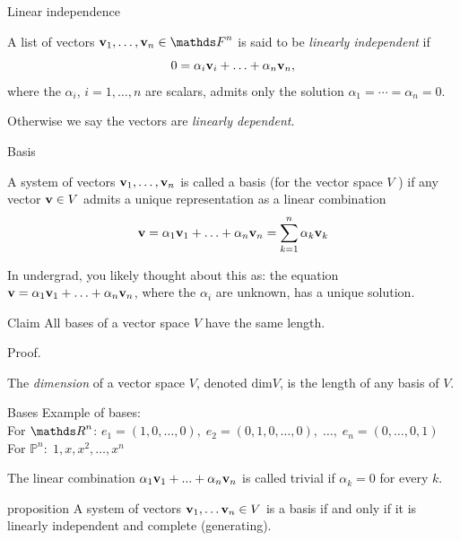\documentclass [aspectratio=169]{beamer}
\begin{document}
\begin{frame}{Linear independence}
\begin{definition}
A list of vectors $\bv_1, \ldots, \bv_n \in \F^n$ is said to be \emph{linearly independent} if 
$$ 0 = \alpha_i {\mathbf{v}}_i + \ldots + \alpha_n {\mathbf{v}}_n, $$
where the $\alpha_i$, $i=1,\ldots,n$ are scalars, admits only the solution $\alpha_1 = \cdots = \alpha_n = 0$.
\end{definition}

\vspace{1em} Otherwise we say the vectors are \emph{linearly dependent}.

\end{frame}


\begin{frame}{Basis}
\begin{definition}
A system of vectors ${\mathbf{v}}_1, \ldots, {\mathbf{v}}_n$ is called a basis (for the vector space $V$ ) if any vector ${\mathbf{v}} \in V$ admits a unique representation as a linear combination
$$
{\mathbf{v}} = \alpha_1 {\mathbf{v}}_1 + \ldots + \alpha_n {\mathbf{v}}_n = \sum_{k=1}^n \alpha_k {\mathbf{v}}_k
$$
\end{definition}

In undergrad, you likely thought about this as: the equation ${\mathbf{v}} = \alpha_1 {\mathbf{v}}_1 + \ldots + \alpha_n {\mathbf{v}}_n$, where the $\alpha_i$ are unknown, has a unique solution.
\end{frame}

\begin{frame}


\begin{exampleblock}{Claim}
All bases of a vector space $V$ have the same length.
\end{exampleblock}

Proof.

\vspace{4cm}

\begin{definition}
The \emph{dimension} of a vector space $V$, denoted $\text{dim} V$, is the length of any basis of $V$.
\end{definition}


\end{frame}

\begin{frame}{Bases}
Example of bases: \\
For $\R^n$: $e_1 = (1,0,\ldots, 0), \; e_2 = (0,1,0,\ldots,0), \; \ldots, \; e_n = (0, \ldots, 0, 1)$ \\
For $\mathbb{P}^n: \; 1, x, x^2, \ldots, x^n$

\begin{definition}
The linear combination $\alpha_{1}{\mathbf{v}}_{1}+...+\alpha_{n}{\mathbf{v}}_{n}$ is called trivial if $\alpha_k = 0$ for every $k$.
\end{definition}

\begin{block}{proposition}
 A system of vectors ${\mathbf{v}}_1, \ldots {\mathbf{v}}_n \in V$ is a basis if and only if it is linearly independent and complete (generating).
\end{block}

\end{frame}
\end{document}
